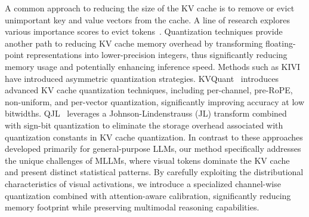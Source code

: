 A common approach to reducing the size of the KV cache is to remove or evict unimportant key and value vectors from the cache.
A line of research explores various importance scores to evict tokens~\cite{zhang2023h2o, jin2024llm, cai2024pyramidkv}. 
Quantization techniques provide another path to reducing KV cache memory overhead by transforming floating-point representations into lower-precision integers, thus significantly reducing memory usage and potentially enhancing inference speed. Methods such as KIVI~\citep{liukivi} have introduced asymmetric quantization strategies.
KVQuant~\citep{hooper2024kvquant} introduces advanced KV cache quantization techniques, including per-channel, pre-RoPE, non-uniform, and per-vector quantization, significantly improving accuracy at low bitwidths.
QJL~\citep{zandieh2024qjl} leverages a Johnson-Lindenstrauss (JL) transform combined with sign-bit quantization to eliminate the storage overhead associated with quantization constants in KV cache quantization.
In contrast to these approaches developed primarily for general-purpose LLMs, our method specifically addresses the unique challenges of MLLMs, where visual tokens dominate the KV cache and present distinct statistical patterns. By carefully exploiting the distributional characteristics of visual activations, we introduce a specialized channel-wise quantization combined with attention-aware calibration, significantly reducing memory footprint while preserving multimodal reasoning capabilities.
